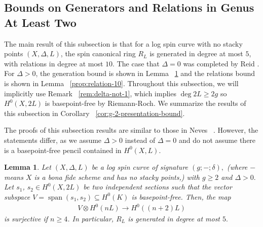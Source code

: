 \documentclass{amsart}
\theoremstyle{plain}
\newtheorem{lem}[thm]{Lemma}
\theoremstyle{definition}
\theoremstyle{remark}
\numberwithin{equation}{section}
\newcommand\ssec{\subsection}
\newcommand{\halfcan}{L}
\DeclareMathOperator{\newspan}{span}
\begin{document}
\ssec{Bounds on Generators and Relations in Genus At Least Two}
\label{ssec:bounds-high-genus}

The main result of this subsection is that for a log spin curve with no stacky points $(X, \Delta, L)$, the spin canonical ring $R_\halfcan$ is generated in degree at most $5$, with relations in degree at most $10$. The case that $\Delta = 0$ was completed by Reid \cite[Theorem 3.4]{reid:infinitesimal}. For $\Delta > 0$, the generation bound is shown in Lemma ~\ref{lem:generation-5} and the relations bound is shown in Lemma ~\ref{prop:relation-10}. Throughout this subsection, we will implicitly use Remark ~\ref{rem:delta-not-1}, which implies $\deg 2L \geq 2g$ so $H^0(X, 2L)$ is basepoint-free by Riemann-Roch. We summarize the results of this subsection in Corollary ~\ref{cor:g-2-presentation-bound}.

The proofs of this subsection results are similar to those in Neves ~\cite[Proposition III.4 and Proposition III.12]{neves:halfcan}. However, the statements differ, as we assume $\Delta > 0$ instead of $\Delta = 0$ and do not assume there is a basepoint-free pencil contained in $H^0(X, L).$ 

\begin{lem}
\label{lem:generation-5}
Let $(X, \Delta, L)$ be a log spin curve of signature $(g;-;\delta),$ {\rm(}where $-$ means $X$ is a bona fide scheme and has no stacky points,{\rm)}
with $g \geq 2$ and $\Delta > 0.$ Let $s_1$, $s_2 \in H^0(X, 2L)$
be two independent sections such that the vector subspace $V =
\newspan(s_1, s_2) \subseteq H^0(K)$ is basepoint-free. Then, the map
\begin{align*}
	V \otimes H^0(nL) \rightarrow H^0((n+2)L)
\end{align*}
is surjective if $n \geq 4$. In particular, $R_\halfcan$ is generated in degree at most $5.$
\end{lem}
\end{document}
